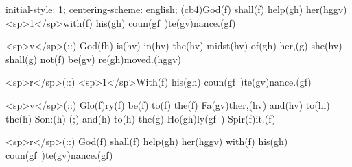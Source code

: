 initial-style: 1;
centering-scheme: english;
(cb4)God(f) shall(f) help(gh) her(hggv) <sp>1</sp>with(f) his(gh) coun(gf~)te(gv)nance.(gf)

<sp>v</sp>(::) God(fh) is(hv) in(hv) the(hv) midst(hv) of(gh) her,(g) she(hv) shall(g) not(f) be(gv) re(gh)moved.(hggv)

<sp>r</sp>(::) <sp>1</sp>With(f) his(gh) coun(gf~)te(gv)nance.(gf)

<sp>v</sp>(::) Glo(f)ry(f) be(f) to(f) the(f) Fa(gv)ther,(hv) and(hv) to(hi) the(h) Son:(h) (;) and(h) to(h) the(g) Ho(gh)ly(gf~) Spir(f)it.(f)

<sp>r</sp>(::) God(f) shall(f) help(gh) her(hggv) with(f) his(gh) coun(gf~)te(gv)nance.(gf)